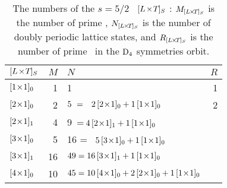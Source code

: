 
\begin{table}
\caption[]{\label{tab:LxTs=5/2}    \small
The numbers of the ${s}=5/2$ \catlatt\
${[{L_{}}\!\times\!{T_{}}]_{S_{}}}$ \twots: $M_{{[{L_{}}\!\times\!{T_{}}]_{S_{}}}}$ is the
number of prime \twots, $N_{{[{L_{}}\!\times\!{T_{}}]_{S_{}}}}$ is the
number of doubly periodic lattice states,
and $R_{{[{L_{}}\!\times\!{T_{}}]_{S_{}}}}$ is the number of prime \twots\ in the
$\textrm{D}_{4}$ symmetries orbit.
}
\begin{center}
{\small
\begin{tabular}{lrlr}
\\[-16pt]
${[{L_{}}\!\times\!{T_{}}]_{S_{}}}$
                  & $M$ %
                         & $N$ %
                                                 &$R$\\
\hline
${[1\!\times\!1]_{0}}$  &   1  &   1                   & 1 \\
${[2\!\times\!1]_{0}}$  &   2  &
  $5~=\;\;\,2\,{[2\!\times\!1]_{0}}+1\,{[1\!\times\!1]_{0}}$
                                                 & 2 \\
${[2\!\times\!1]_{1}}$&   4  & 9~\;=\;\;\,$
                           {4}\,{[2\!\times\!1]_{1}}
                         + {1}\,{[1\!\times\!1]_{0}}$
                                                 &   \\
${[3\!\times\!1]_{0}}$  &   5  & 16 =~ ${5}\,{[3\!\times\!1]_{0}}
                         + {1}\,{[1\!\times\!1]_{0}}$
                                                 &   \\
${[3\!\times\!1]_{1}}$&   16 & $49 =16\,{[3\!\times\!1]_{1}}
                         + {1}\,{[1\!\times\!1]_{0}}$
                                                 &   \\
${[4\!\times\!1]_{0}}$  &  10 & $45 =10\,\BravCell{4}{1}{0} %
                         + {2}\,\BravCell{2}{1}{0}
                         + {1}\,\BravCell{1}{1}{0}$
                                                 &   \\

\end{tabular}}
\end{center}
\end{table}
